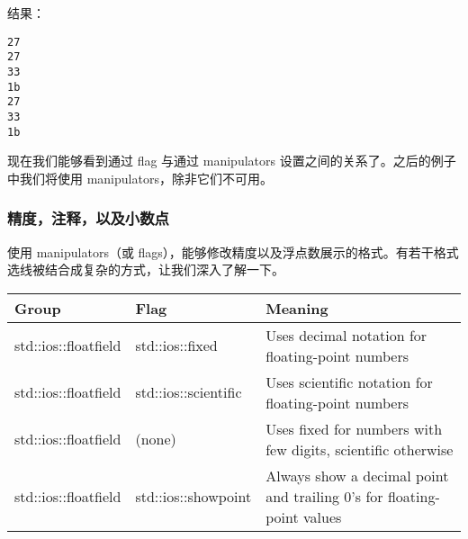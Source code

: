 \documentclass[../../LearnCpp.tex]{subfiles}
\begin{document}
结果：

\begin{lstlisting}
27
27
33
1b
27
33
1b
\end{lstlisting}

现在我们能够看到通过 flag 与通过 manipulators 设置之间的关系了。之后的例子中我们将使用 manipulators，除非它们不可用。

\subsubsection*{精度，注释，以及小数点}

使用 manipulators（或 flags），能够修改精度以及浮点数展示的格式。有若干格式选线被结合成复杂的方式，让我们深入了解一下。

\begin{center}
  \begin{tiny}
    \begin{tabularx}{ 1\textwidth}{
        | >{\raggedright\arraybackslash}X
        | >{\raggedright\arraybackslash}X
        | >{\raggedright\arraybackslash}X |
      }
      \hline
      Group                & Flag                 & Meaning                                                                \\
      \hline
      std::ios::floatfield & std::ios::fixed      & Uses decimal notation for floating-point numbers                       \\
      std::ios::floatfield & std::ios::scientific & Uses scientific notation for floating-point numbers                    \\
      std::ios::floatfield & (none)               & Uses fixed for numbers with few digits, scientific otherwise           \\
      std::ios::floatfield & std::ios::showpoint  & Always show a decimal point and trailing 0’s for floating-point values \\
      \hline
    \end{tabularx}
  \end{tiny}
\end{center}
\end{document}
